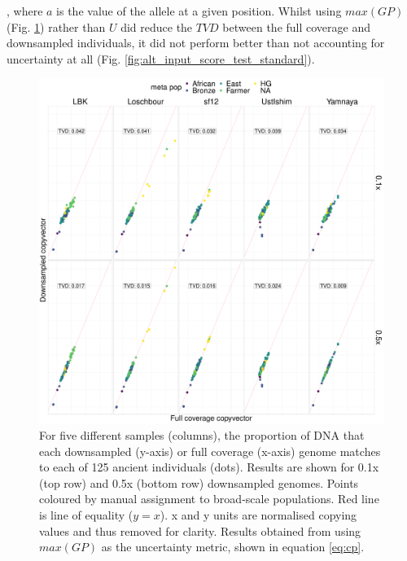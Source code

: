 , where $a$ is the value of the allele at a given position. Whilst using $max(GP)$ (Fig. \ref{fig:alt_input_score_test_uncertainty}) rather than $U$ did reduce the $TVD$ between the full coverage and downsampled individuals, it did not perform better than not accounting for uncertainty at all (Fig. \ref{fig:alt_input_score_test_standard}).

\begin{figure}[htp]
    \centering
    \includegraphics[width=1.0\textwidth]{../images/appendix/uncertainty.pdf}
    \caption{For five different samples (columns), the proportion of DNA that each downsampled (y-axis) or full coverage (x-axis) genome matches to each of 125 ancient individuals (dots). Results are shown for 0.1x (top row) and 0.5x (bottom row) downsampled genomes. Points coloured by manual assignment to broad-scale populations. Red line is line of equality ($y=x$). x and y units are normalised copying values and thus removed for clarity. Results obtained from using $max(GP)$ as the uncertainty metric, shown in equation \ref{eq:cp}.}
    \label{fig:alt_input_score_test_uncertainty}
\end{figure}

